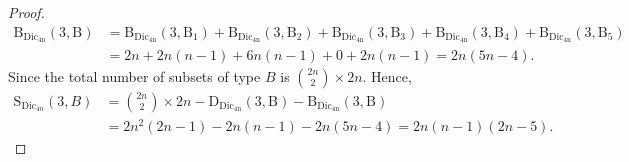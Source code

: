 \documentclass[10pt,a4paper]{amsart}
\begin{document}
\begin{proof}
\begin{align*}
\mathrm{B_{\mathrm{Dic_{4n}}}(3,B)}&=\mathrm{B_{\mathrm{Dic_{4n}}}(3,B_1)}+\mathrm{B_{\mathrm{Dic_{4n}}}(3,B_2)}+\mathrm{B_{\mathrm{Dic_{4n}}}(3,B_3)}+\mathrm{B_{\mathrm{Dic_{4n}}}(3,B_4)}+\mathrm{B_{\mathrm{Dic_{4n}}}(3,B_5)}\\&=2n+2n(n-1)+6n(n-1)+0+2n(n-1)=2n(5n-4).\end{align*}
Since the total number of subsets of type $B$ is $\binom{2n}{2}\times 2n$. Hence, 
\begin{align*}
    \mathrm{S}_{\mathrm{Dic}_{4n}}(3,B)&= \binom{2n}{2}\times 2n- \mathrm{D_{\mathrm{Dic_{4n}}}(3,B)}-\mathrm{B_{\mathrm{Dic_{4n}}}(3,B)}\\&=2n^{2}(2n-1)-2n(n-1)-2n(5n-4)=2n(n-1)(2n-5).
\end{align*}
\end{proof}
\end{document}
